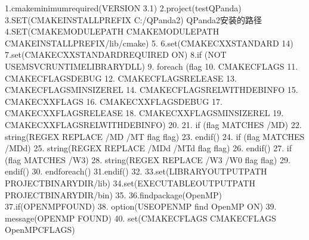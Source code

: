 \documentclass[a4paper,11pt,english]{sphinxmanual}
\begin{document}
\begin{sphinxVerbatim}[commandchars=\\\{\}]
1.cmake\PYGZus{}minimum\PYGZus{}required(VERSION 3.1)
2.project(testQPanda)
3.SET(CMAKE\PYGZus{}INSTALL\PYGZus{}PREFIX  \PYGZdq{}C:/QPanda2\PYGZdq{}) \PYGZsh{} QPanda2安装的路径
4.SET(CMAKE\PYGZus{}MODULE\PYGZus{}PATH \PYGZdl{}\PYGZob{}CMAKE\PYGZus{}MODULE\PYGZus{}PATH\PYGZcb{} \PYGZdq{}\PYGZdl{}\PYGZob{}CMAKE\PYGZus{}INSTALL\PYGZus{}PREFIX\PYGZcb{}/lib/cmake\PYGZdq{})
5.
6.set(CMAKE\PYGZus{}CXX\PYGZus{}STANDARD 14)
7.set(CMAKE\PYGZus{}CXX\PYGZus{}STANDARD\PYGZus{}REQUIRED ON)
8.if (NOT USE\PYGZus{}MSVC\PYGZus{}RUNTIME\PYGZus{}LIBRARY\PYGZus{}DLL)
9.    foreach (flag
10.        CMAKE\PYGZus{}C\PYGZus{}FLAGS
11.        CMAKE\PYGZus{}C\PYGZus{}FLAGS\PYGZus{}DEBUG
12.        CMAKE\PYGZus{}C\PYGZus{}FLAGS\PYGZus{}RELEASE
13.        CMAKE\PYGZus{}C\PYGZus{}FLAGS\PYGZus{}MINSIZEREL
14.        CMAKE\PYGZus{}C\PYGZus{}FLAGS\PYGZus{}RELWITHDEBINFO
15.        CMAKE\PYGZus{}CXX\PYGZus{}FLAGS
16.        CMAKE\PYGZus{}CXX\PYGZus{}FLAGS\PYGZus{}DEBUG
17.        CMAKE\PYGZus{}CXX\PYGZus{}FLAGS\PYGZus{}RELEASE
18.        CMAKE\PYGZus{}CXX\PYGZus{}FLAGS\PYGZus{}MINSIZEREL
19.        CMAKE\PYGZus{}CXX\PYGZus{}FLAGS\PYGZus{}RELWITHDEBINFO)
20.
21.        if (\PYGZdl{}\PYGZob{}flag\PYGZcb{} MATCHES \PYGZdq{}/MD\PYGZdq{})
22.            string(REGEX REPLACE \PYGZdq{}/MD\PYGZdq{} \PYGZdq{}/MT\PYGZdq{} \PYGZdl{}\PYGZob{}flag\PYGZcb{} \PYGZdq{}\PYGZdl{}\PYGZob{}\PYGZdl{}\PYGZob{}flag\PYGZcb{}\PYGZcb{}\PYGZdq{})
23.        endif()
24.        if (\PYGZdl{}\PYGZob{}flag\PYGZcb{} MATCHES \PYGZdq{}/MDd\PYGZdq{})
25.            string(REGEX REPLACE \PYGZdq{}/MDd\PYGZdq{} \PYGZdq{}/MTd\PYGZdq{} \PYGZdl{}\PYGZob{}flag\PYGZcb{} \PYGZdq{}\PYGZdl{}\PYGZob{}\PYGZdl{}\PYGZob{}flag\PYGZcb{}\PYGZcb{}\PYGZdq{})
26.        endif()
27.        if (\PYGZdl{}\PYGZob{}flag\PYGZcb{} MATCHES \PYGZdq{}/W3\PYGZdq{})
28.            string(REGEX REPLACE \PYGZdq{}/W3\PYGZdq{} \PYGZdq{}/W0\PYGZdq{} \PYGZdl{}\PYGZob{}flag\PYGZcb{} \PYGZdq{}\PYGZdl{}\PYGZob{}\PYGZdl{}\PYGZob{}flag\PYGZcb{}\PYGZcb{}\PYGZdq{})
29.        endif()
30.    endforeach()
31.endif()
32.
33.set(LIBRARY\PYGZus{}OUTPUT\PYGZus{}PATH \PYGZdl{}\PYGZob{}PROJECT\PYGZus{}BINARY\PYGZus{}DIR\PYGZcb{}/lib)
34.set(EXECUTABLE\PYGZus{}OUTPUT\PYGZus{}PATH \PYGZdl{}\PYGZob{}PROJECT\PYGZus{}BINARY\PYGZus{}DIR\PYGZcb{}/bin)
35.
36.find\PYGZus{}package(OpenMP)
37.if(OPENMP\PYGZus{}FOUND)
38.    option(USE\PYGZus{}OPENMP \PYGZdq{}find OpenMP\PYGZdq{} ON)
39.    message(\PYGZdq{}OPENMP FOUND\PYGZdq{})
40.    set(CMAKE\PYGZus{}C\PYGZus{}FLAGS \PYGZdq{}\PYGZdl{}\PYGZob{}CMAKE\PYGZus{}C\PYGZus{}FLAGS\PYGZcb{} \PYGZdl{}\PYGZob{}OpenMP\PYGZus{}C\PYGZus{}FLAGS\PYGZcb{}\PYGZdq{})

\end{sphinxVerbatim}
\end{document}

